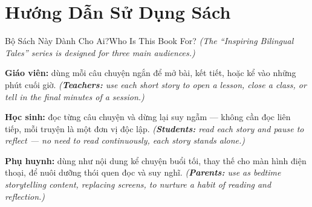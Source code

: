 \chapter*{Hướng Dẫn Sử Dụng Sách}

\begin{truyen}{Bộ Sách Này Dành Cho Ai?}{Who Is This Book For?}
\textit{(The ``Inspiring Bilingual Tales'' series is designed for three main audiences.)}

\textbf{Giáo viên:} dùng mỗi câu chuyện ngắn để mở bài, kết tiết, hoặc kể vào những phút cuối giờ.
\textit{(\textbf{Teachers:} use each short story to open a lesson, close a class, or tell in the final minutes of a session.)}

\textbf{Học sinh:} đọc từng câu chuyện và dừng lại suy ngẫm --- không cần đọc liên tiếp, mỗi truyện là một đơn vị độc lập.
\textit{(\textbf{Students:} read each story and pause to reflect --- no need to read continuously, each story stands alone.)}

\textbf{Phụ huynh:} dùng như nội dung kể chuyện buổi tối, thay thế cho màn hình điện thoại, để nuôi dưỡng thói quen đọc và suy nghĩ.
\textit{(\textbf{Parents:} use as bedtime storytelling content, replacing screens, to nurture a habit of reading and reflection.)}
\end{truyen}

\vspace{6pt}

